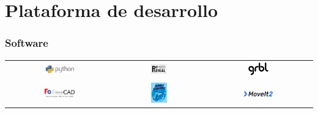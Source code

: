 \documentclass{beamer}
\begin{document}
\section{Plataforma de desarrollo}
\begin{frame}
\frametitle{Software}
\begin{table}[htbp]
  \centering
  \begin{tabular}{ccc}
      \includegraphics[width=0.3\textwidth, valign=m]{figs/phyton.jpg} & \includegraphics[width=0.2\textwidth, valign=m]{figs/pyserial.png} &
      \includegraphics[width=0.2\textwidth, valign=m]{figs/grbl.png} \\
      \includegraphics[width=0.3\textwidth, valign=m]{figs/freecad.png} & \includegraphics[width=0.2\textwidth, valign=m]{figs/ros2logo.jpeg} & 
      \includegraphics[width=0.3\textwidth, valign=m]{figs/moveit2.png}
  \end{tabular}
\end{table}
\end{frame}
\end{document}

